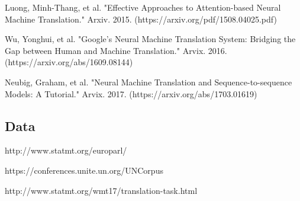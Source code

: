 \documentclass[10pt,a4paper]{article}
\begin{document}
Luong, Minh-Thang, et al. "Effective Approaches to Attention-based Neural Machine Translation." Arxiv. 2015.
(https://arxiv.org/pdf/1508.04025.pdf)
\newline

Wu, Yonghui, et al. "Google’s Neural Machine Translation System: Bridging the Gap between Human and Machine Translation." Arvix. 2016.
(https://arxiv.org/abs/1609.08144)
\newline

Neubig, Graham, et al. "Neural Machine Translation and Sequence-to-sequence Models: A Tutorial." Arvix. 2017.
(https://arxiv.org/abs/1703.01619)
\newline


\subsection{Data}

http://www.statmt.org/europarl/

https://conferences.unite.un.org/UNCorpus

http://www.statmt.org/wmt17/translation-task.html
\end{document}
